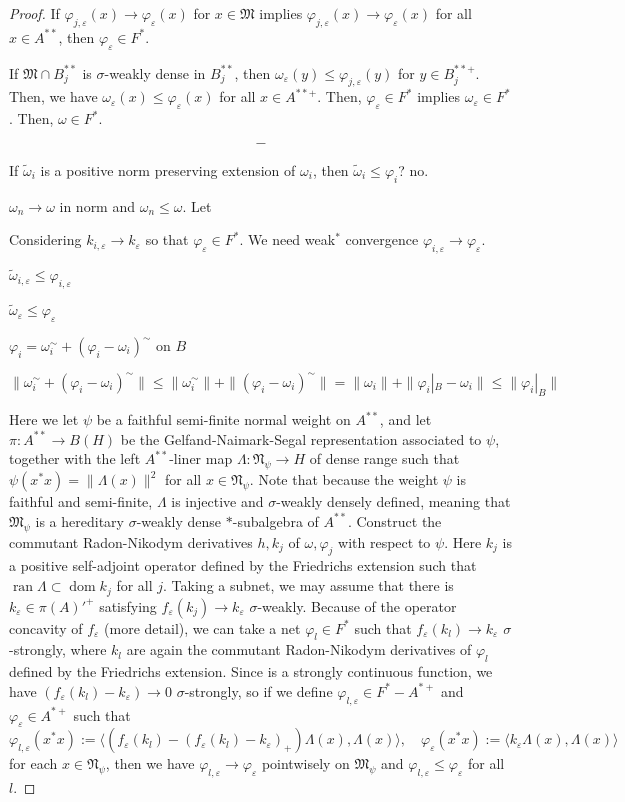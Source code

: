 \documentclass[a4paper]{amsart}
\newcommand{\e}{\varepsilon}
\theoremstyle{plain}
\theoremstyle{definition}
\begin{document}
\begin{proof}
If $\varphi_{j,\e}(x)\to\varphi_\e(x)$ for $x\in\mathfrak{M}$ implies $\varphi_{j,\e}(x)\to\varphi_\e(x)$ for all $x\in A^{**}$, then $\varphi_\e\in F^*$.

If $\mathfrak{M}\cap B_j^{**}$ is $\sigma$-weakly dense in $B_j^{**}$, then $\omega_\e(y)\le\varphi_{j,\e}(y)$ for $y\in B_j^{**+}$.
Then, we have $\omega_\e(x)\le\varphi_\e(x)$ for all $x\in A^{**+}$.
Then, $\varphi_\e\in F^*$ implies $\omega_\e\in F^*$.
Then, $\omega\in F^*$.

\[-\]


If $\widetilde\omega_i$ is a positive norm preserving extension of $\omega_i$, then $\widetilde\omega_i\le\varphi_i$? no.


$\omega_n\to\omega$ in norm and $\omega_n\le\omega$.
Let 


Considering $k_{i,\e}\to k_\e$ so that $\varphi_\e\in F^*$.
We need weak$^*$ convergence $\varphi_{i,\e}\to\varphi_\e$.

$\widetilde\omega_{i,\e}\le\varphi_{i,\e}$

$\widetilde\omega_\e\le\varphi_\e$

$\varphi_i=\omega_i^\sim+(\varphi_i-\omega_i)^\sim$ on $B$

$\|\omega_i^\sim+(\varphi_i-\omega_i)^\sim\|\le\|\omega_i^\sim\|+\|(\varphi_i-\omega_i)^\sim\|=\|\omega_i\|+\|\varphi_i|_B-\omega_i\|\le\|\varphi_i|_B\|$


Here we let $\psi$ be a faithful semi-finite normal weight on $A^{**}$, and let $\pi:A^{**}\to B(H)$ be the Gelfand-Naimark-Segal representation associated to $\psi$, together with the left $A^{**}$-liner map $\Lambda:\mathfrak{N}_\psi\to H$ of dense range such that $\psi(x^*x)=\|\Lambda(x)\|^2$ for all $x\in\mathfrak{N}_\psi$.
Note that because the weight $\psi$ is faithful and semi-finite, $\Lambda$ is injective and $\sigma$-weakly densely defined, meaning that $\mathfrak{M}_\psi$ is a hereditary $\sigma$-weakly dense $*$-subalgebra of $A^{**}$.
Construct the commutant Radon-Nikodym derivatives $h,k_j$ of $\omega,\varphi_j$ with respect to $\psi$.
Here $k_j$ is a positive self-adjoint operator defined by the Friedrichs extension such that $\operatorname{ran}\Lambda\subset\operatorname{dom}k_j$ for all $j$.
Taking a subnet, we may assume that there is $k_\e\in\pi(A)'^+$ satisfying $f_\e(k_j)\to k_\e$ $\sigma$-weakly.
Because of the operator concavity of $f_\e$ (more detail), we can take a net $\varphi_l\in F^*$ such that $f_\e(k_l)\to k_\e$ $\sigma$-strongly, where $k_l$ are again the commutant Radon-Nikodym derivatives of $\varphi_l$ defined by the Friedrichs extension.
Since  is a strongly continuous function, we have $(f_\e(k_l)-k_\e)\to0$ $\sigma$-strongly, so if we define $\varphi_{l,\e}\in F^*-A^{*+}$ and $\varphi_\e\in A^{*+}$ such that
\[\varphi_{l,\e}(x^*x):=\langle(f_\e(k_l)-(f_\e(k_l)-k_\e)_+)\Lambda(x),\Lambda(x)\rangle,\quad\varphi_\e(x^*x):=\langle k_\e\Lambda(x),\Lambda(x)\rangle\]
for each $x\in\mathfrak{N}_\psi$, then we have $\varphi_{l,\e}\to\varphi_\e$ pointwisely on $\mathfrak{M}_\psi$ and $\varphi_{l,\e}\le\varphi_\e$ for all $l$.


\end{proof}
\end{document}

